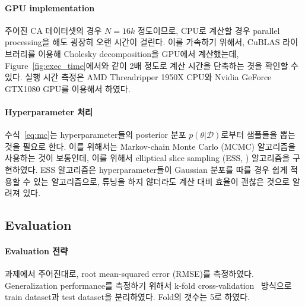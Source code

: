 \documentclass[ba]{imsart}
\begin{document}
\paragraph{GPU implementation}
주어진 CA 데이터셋의 경우 \(N=16k\) 정도이므로, CPU로 계산할 경우 parallel processing을 해도 굉장히 오랜 시간이 걸린다.
이를 가속하기 위해서, CuBLAS 라이브러리를 이용해 Cholesky decomposition을 GPU에서 계산했는데, Figure~\ref{fig:exec_time}에서와 같이 2배 정도로 계산 시간을 단축하는 겻을 확인할 수 있다.
실행 시간 측정은 AMD Threadripper 1950X CPU와 Nvidia GeForce GTX1080 GPU를 이용해서 하였다.

\paragraph{Hyperparameter 처리}
수식~\eqref{eq:mc}는 hyperparameter들의 posterior 분포 \(p(\theta | \mathcal{D})\)로부터 샘플들을 뽑는 것을 필요로 한다.
이를 위해서는 Markov-chain Monte Carlo (MCMC) 알고리즘을 사용하는 것이 보통인데, 이를 위해서 elliptical slice sampling (ESS, \citealt{murray_elliptical_2010}) 알고리즘을 구현하였다.
ESS 알고리즘은 hyperparameter들이 Gaussian 분포를 따를 경우 쉽게 적용할 수 있는 알고리즘으로, 튜닝을 하지 않더라도 계산 대비 효율이 괜찮은 것으로 알려져 있다.


\subsection{Evaluation}\label{section:eval}
\paragraph{Evaluation 전략}
과제에서 주어진대로, root mean-squared error (RMSE)를 측정하였다.
Generalization performance를 측정하기 위해서 k-fold cross-validation~\citep{murphy_machine_2012} 방식으로 train dataset과 test dataset을 분리하였다.
Fold의 갯수는 5로 하였다.
\end{document}
